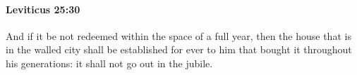 
		\paragraph{Leviticus 25:30} %
			\label{LEVITICUS-25-30}

			And if it be not redeemed within the space of a full year, then the house that is in the walled city shall be established for ever to him that bought it throughout his generations: it shall not go out in the jubile.


